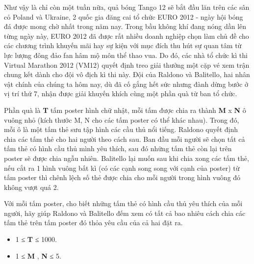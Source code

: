 Như vậy là chỉ còn một tuần nữa, quả bóng Tango 12 sẽ bắt đầu lăn trên các sân cỏ Poland và Ukraine, 2 quốc gia đăng cai tổ chức EURO 2012 - ngày hội bóng đá được mong chờ nhất trong năm nay. Trong bầu không khí đang nóng dần lên từng ngày này, EURO 2012 đã được rất nhiều doanh nghiệp chọn làm chủ đề cho các chương trình khuyến mãi hay sự kiện với mục đích thu hút sự quan tâm từ lực lượng đông đảo fan hâm mộ môn thể thao vua. Do đó, các nhà tổ chức kì thi Virtual Marathon 2012 (VM12) quyết định treo giải thưởng một cặp vé xem trận chung kết dành cho đội vô địch kì thi này. Đội của Raldono và Balitello, hai nhân vật chính của chúng ta hôm nay, dù đã cố gắng hết sức nhưng đành dừng bước ở vị trí thứ 7, nhận được giải khuyến khích cùng một phần quà từ ban tổ chức.





Phần quà là \textbf{ T } tấm poster hình chữ nhật, mỗi tấm được chia ra thành \textbf{ M } x \textbf{ N } ô vuông nhỏ (kích thước M, N cho các tấm poster có thể khác nhau). Trong đó, mỗi ô là một tấm thẻ sưu tập hình các cầu thủ nổi tiếng. Raldono quyết định chia các tấm thẻ cho hai người theo cách sau. Ban đầu mỗi người sẽ chọn tất cả tấm thẻ có hình cầu thủ mình yêu thích, sau đó những tấm thẻ còn lại trên poster sẽ được chia ngẫu nhiên. Balitello lại muốn sau khi chia xong các tấm thẻ, nếu cắt ra 1 hình vuông bất kì (có các cạnh song song với cạnh của poster) từ tấm poster thì chênh lệch số thẻ được chia cho mỗi người trong hình vuông đó không vượt quá 2.




Với mỗi tấm poster, cho biết những tấm thẻ có hình cầu thủ yêu thích của mỗi người, hãy giúp Raldono và Balitello đếm xem có tất cả bao nhiêu cách chia các tấm thẻ trên tấm poster đó thỏa yêu cầu của cả hai đặt ra.
\begin{itemize}
	\item 1 ≤ \textbf{ T } ≤ 1000.
\end{itemize}
\begin{itemize}
	\item 1 ≤ \textbf{ M } , \textbf{ N } ≤ 5.
\end{itemize}